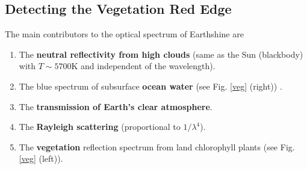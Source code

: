\subsection{Detecting the Vegetation Red Edge}

The main contributors to the optical spectrum of Earthshine \cite{writeup}
\cite{USGS} are
\begin{enumerate}
 \item The {\bf neutral reflectivity from high clouds} (same as the Sun
(blackbody) with $T \sim 5700$K and independent of the wavelength).
\item The blue  spectrum of subsurface {\bf ocean water} (see Fig. \ref{veg} (right))
.
\item The {\bf transmission of Earth's  clear atmosphere}.
\item The {\bf Rayleigh scattering} (proportional to $1/\lambda^4$).
\item The {\bf vegetation} reflection spectrum from land chlorophyll
plants (see  Fig. \ref{veg} (left)).
\end{enumerate}



